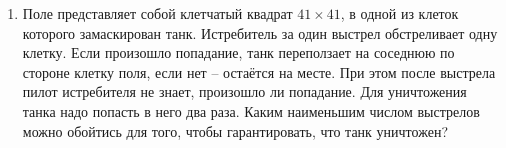 \documentclass{article}
\begin{document}
\begin{enumerate}[label*=\protect\fbox{\arabic{enumi}}]
\item Поле представляет собой клетчатый квадрат $41 \times 41$, в одной из клеток которого замаскирован танк. Истребитель за один выстрел обстреливает одну клетку. Если произошло попадание, танк переползает на соседнюю по стороне клетку поля, если нет – остаётся на месте. При этом после выстрела пилот истребителя не знает, произошло ли попадание. Для уничтожения танка надо попасть в него два раза. Каким наименьшим числом выстрелов можно обойтись для того, чтобы гарантировать, что танк уничтожен? 


\end{enumerate}
\end{document}
